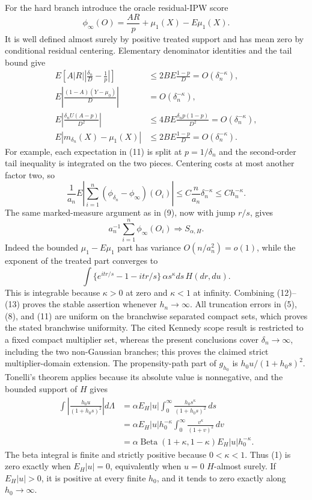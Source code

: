 For the hard branch introduce the oracle residual-IPW score
\[
 \phi_\infty(O)=\frac{AR}{p}+\mu_1(X)-E\mu_1(X).
\]
It is well defined almost surely by positive treated support and has mean zero by conditional residual centering.  Elementary denominator identities and the tail bound give
\[
\begin{split}
 E\left[A|R|\left|\frac{\delta_n}{D}-\frac1p\right|\right]
 &\leq 2B E\frac{1-p}{D}=O(\delta_n^{-\kappa}),\\
 E\left|\frac{(1-A)(Y-\mu_0)}D\right|&=O(\delta_n^{-\kappa}),\\
 E\left|\frac{\delta_nU(A-p)}{D^2}\right|&\leq4B E\frac{\delta_np(1-p)}{D^2}=O(\delta_n^{-\kappa}),\\
 E|m_{\delta_n}(X)-\mu_1(X)|&\leq2B E\frac{1-p}{D}=O(\delta_n^{-\kappa}).
\end{split} \tag{11}
\]
For example, each expectation in (11) is split at \(p=1/\delta_n\) and the second-order tail inequality is integrated on the two pieces.  Centering costs at most another factor two, so
\[
 \frac1{a_n}E\left|\sum_{i=1}^n(\phi_{\delta_n}-\phi_\infty)(O_i)\right|
 \leq C\frac n{a_n}\delta_n^{-\kappa}\leq C h_n^{-\kappa}. \tag{12}
\]
The same marked-measure argument as in (9), now with jump \(r/s\), gives
\[
 a_n^{-1}\sum_{i=1}^n\phi_\infty(O_i)\Rightarrow S_{\alpha,H}. \tag{13}
\]
Indeed the bounded \(\mu_1-E\mu_1\) part has variance \(O(n/a_n^2)=o(1)\), while the exponent of the treated part converges to
\[
 \int\{e^{itr/s}-1-itr/s\}\,\alpha s^\kappa ds\,H(dr,du).
\]
This is integrable because \(\kappa>0\) at zero and \(\kappa<1\) at infinity.  Combining (12)--(13) proves the stable assertion whenever \(h_n\to\infty\).  All truncation errors in (5), (8), and (11) are uniform on the branchwise separated compact sets, which proves the stated branchwise uniformity.  The cited Kennedy scope result is restricted to a fixed compact multiplier set, whereas the present conclusions cover \(\delta_n\to\infty\), including the two non-Gaussian branches; this proves the claimed strict multiplier-domain extension.
The propensity-path part of \(g_{h_0}\) is \(h_0u/(1+h_0s)^2\).  Tonelli's theorem applies because its absolute value is nonnegative, and the bounded support of \(H\) gives
\[
\begin{split}
 \int\left|\frac{h_0u}{(1+h_0s)^2}\right|d\Lambda
 &=\alpha E_H|u|\int_0^\infty\frac{h_0s^\kappa}{(1+h_0s)^2}\,ds\\
 &=\alpha E_H|u|h_0^{-\kappa}\int_0^\infty\frac{v^\kappa}{(1+v)^2}\,dv\\
 &=\alpha\operatorname{Beta}(1+\kappa,1-\kappa)E_H|u|h_0^{-\kappa}.
\end{split} \tag{1}
\]
The beta integral is finite and strictly positive because \(0<\kappa<1\).  Thus (1) is zero exactly when \(E_H|u|=0\), equivalently when \(u=0\) \(H\)-almost surely.  If \(E_H|u|>0\), it is positive at every finite \(h_0\), and it tends to zero exactly along \(h_0\to\infty\).

